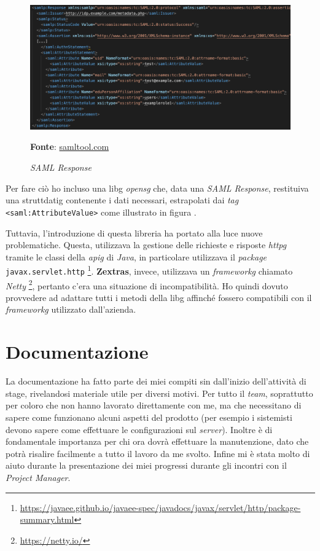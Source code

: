     \begin{figure}[ht]
        \centering
        \includegraphics[width=1\textwidth]{immagini/saml_response.png}
        \caption{\textit{SAML Response}}
        \textbf{Fonte}:
        \href{https://www.samltool.com/generic_sso_res.php}{samltool.com}
        \label{fig: SAML Response}
    \end{figure}
    
Per fare ciò ho incluso una \gls{libg} \textit{\gls{opensg}} che, data una \textit{SAML Response}, restituiva una \gls{struttdatig} contenente i dati necessari, estrapolati dai \textit{tag} \texttt{<saml:AttributeValue>} come illustrato in figura .

\newpage

Tuttavia, l'introduzione di questa libreria ha portato alla luce nuove problematiche. Questa, utilizzava la gestione delle richieste e risposte \textit{\gls{httpg}} tramite le classi della \textit{\gls{apig}} di \textit{Java}, in particolare utilizzava il \textit{package} \texttt{javax.servlet.http} \footnote{\url{https://javaee.github.io/javaee-spec/javadocs/javax/servlet/http/package-summary.html}}. \textbf{Zextras}, invece, utilizzava un \textit{\gls{frameworkg}} chiamato \textit{Netty} \footnote{\url{https://netty.io/}}, pertanto c'era una situazione di incompatibilità. Ho quindi dovuto provvedere ad adattare tutti i metodi della \gls{libg} affinché fossero compatibili con il \textit{\gls{frameworkg}} utilizzato dall'azienda. \\

\section{Documentazione}
La documentazione ha fatto parte dei miei compiti sin dall'inizio dell'attività di stage, rivelandosi materiale utile per diversi motivi. Per tutto il \textit{team}, soprattutto per coloro che non hanno lavorato direttamente con me, ma che necessitano di sapere come funzionano alcuni aspetti del prodotto (per esempio i sistemisti devono sapere come effettuare le configurazioni sul \textit{server}). Inoltre è di fondamentale importanza per chi ora dovrà effettuare la manutenzione, dato che potrà risalire facilmente a tutto il lavoro da me svolto. Infine mi è stata molto di aiuto durante la presentazione dei miei progressi durante gli incontri con il \textit{Project Manager}.

